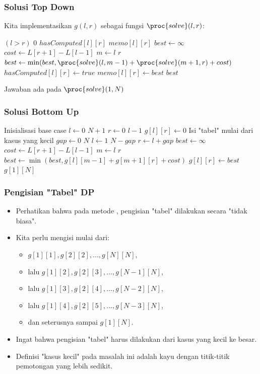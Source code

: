 \begin{frame}
\frametitle{Solusi Top Down}
Kita implementasikan $g(l, r)$ sebagai fungsi $\proc{solve}(l,r)$:
\begin{small}
\begin{codebox}
\li \If $(l > r)$ \Then
\li   \Return $0$
\li \ElseIf $hasComputed[l][r]$ \Then
\li   \Return $memo[l][r]$ 
\li \Else
\li   $best \gets \infty$
\li   $cost \gets L[r+1] - L[l-1]$
\li   \For $m \gets l$ \To $r$ \Do
\li     $best \gets \min(best, \proc{solve}(l,m-1) + \proc{solve}(m+1, r) + cost)$
      \End  
\li   $hasComputed[l][r] \gets true$
\li   $memo[l][r] \gets best$
\li   \Return $best$
    \End
\end{codebox}
\end{small}
Jawaban ada pada $\proc{solve}(1, N)$
\end{frame}

\begin{frame}
\frametitle{Solusi Bottom Up}
\begin{small}
\begin{codebox}
\li \Comment Inisialisasi base case
\li \For $l \gets 0$ \To $N+1$ \Do
\li   \For $r \gets 0$ \To $l-1$ \Do
\li     $g[l][r] \gets 0$
      \End
    \End
\zi
\li \Comment Isi "tabel" mulai dari kasus yang kecil
\li \For $gap \gets 0$ \To $N$ \Do
\li   \For $l \gets 1$ \To $N-gap$ \Do
\li     $r \gets l + gap$
\li     $best \gets \infty$
\li     $cost \gets L[r+1] - L[l-1]$
\li     \For $m \gets l$ \To $r$ \Do
\li       $best \gets \min(best, g[l][m-1] + g[m+1][r] + cost)$
        \End  
\li     $g[l][r] \gets best$
      \End
    \End
\zi
\li \Return $g[1][N]$
\end{codebox}
\end{small}
\end{frame}

\begin{frame}
\frametitle{Pengisian "Tabel" DP}
\begin{itemize}
  \item Perhatikan bahwa pada metode \fbottomup, pengisian "tabel" dilakukan secara "tidak biasa".
  \item Kita perlu mengisi mulai dari:
  \begin{itemize}
    \item $g[1][1], g[2][2], ..., g[N][N]$,
    \item lalu $g[1][2], g[2][3], ..., g[N-1][N]$,
    \item lalu $g[1][3], g[2][4], ..., g[N-2][N]$,
    \item lalu $g[1][4], g[2][5], ..., g[N-3][N]$,    
    \item dan seterusnya sampai $g[1][N]$.
  \end{itemize}
  \item Ingat bahwa pengisian "tabel" harus dilakukan dari kasus yang kecil ke besar.
  \item Definisi "kasus kecil" pada masalah ini adalah kayu dengan titik-titik pemotongan yang lebih sedikit.
\end{itemize}
\end{frame}

